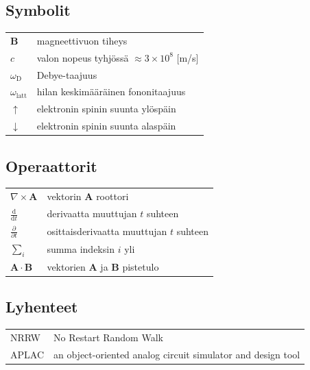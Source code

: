 \documentclass[finnish, 12pt, a4paper, sci, utf8, pdfa]{aaltothesis}
\begin{document}
\thesistableofcontents



\subsection*{Symbolit}

\begin{tabular}{ll}
$\mathbf{B}$  & magneettivuon tiheys  \\
$c$              & valon nopeus tyhjössä $\approx 3\times10^8$ [m/s]\\
$\omega_{\mathrm{D}}$    & Debye-taajuus \\
$\omega_{\mathrm{latt}}$ & hilan keskimääräinen fononitaajuus \\
$\uparrow$       & elektronin spinin suunta ylöspäin\\
$\downarrow$     & elektronin spinin suunta alaspäin
\end{tabular}

\subsection*{Operaattorit}

\begin{tabular}{ll}
$\nabla \times \mathbf{A}$              & vektorin $\mathbf{A}$ roottori\\
$\displaystyle\frac{\mbox{d}}{\mbox{d} t}$ & derivaatta muuttujan $t$ suhteen\\
[3mm]
$\displaystyle\frac{\partial}{\partial t}$  & osittaisderivaatta muuttujan $t$ suhteen \\[3mm]
$\sum_i $                       & summa indeksin $i$ yli\\
$\mathbf{A} \cdot \mathbf{B}$    & vektorien $\mathbf{A}$ ja $\mathbf{B}$ pistetulo
\end{tabular}

\subsection*{Lyhenteet}

\begin{tabular}{ll}
NRRW       & No Restart Random Walk \\
APLAC      & an object-oriented analog circuit simulator and design tool \\
\end{tabular}
\end{document}
